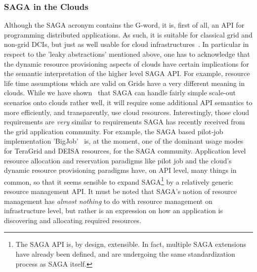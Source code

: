 \documentclass[10pt,conference,final,letterpaper,twoside,twocolumn,]{IEEEtran}
\newcommand{\I}[1]{\textit{#1}}
\begin{document}
 \subsubsection*{SAGA in the Clouds}

  Although the SAGA acronym contains the G-word, it is, first of all,
  an API for programming distributed applications.  As such, it is
  suitable for classical grid and non-grid DCIs, but just as well
  usable for cloud infrastructures~\cite{sagacloud...}.  In particular
  in respect to the 'leaky abstractions' mentioned above, one has to
  acknowledge that the dynamic resource provisioning aspects of clouds
  have certain implications for the semantic interpretation of the
  higher level SAGA API.  For example, resource life time assumptions
  which are valid on Grids have a very different meaning in clouds.
  While we have shown~\cite{sagacloud...} that SAGA can handle fairly
  simple scale-out scenarios onto clouds rather well, it will require
  some additional API semantics to more efficiently, and
  transparently, use cloud resources.  Interestingly, those cloud
  requirements are \I{very} similar to requirements SAGA has recently
  received from the grid application community.  For example, the SAGA
  based pilot-job implementation 'BigJob'~\cite{bigjob} is, at the
  moment, one of the dominant usage modes for TeraGrid and DEISA
  resources, for the SAGA community.  Application level resource
  allocation and reservation paradigms like pilot job and the cloud's
  dynamic resource provisioning paradigms have, on API level, many
  things in common, so that it seems sensible to expand
  SAGA\footnote{The SAGA API is, by design, extensible.  In fact,
  multiple SAGA extensions have already been defined, and are
  undergoing the same standardization process as SAGA itself.} by a
  relatively generic resource management API.  It must be noted that
  SAGA's notion of resource management has \I{almost nothing} to do
  with resource management on infrastructure level, but rather is an
  expression on how an application is discovering and allocating
  required resources.
  
\end{document}
